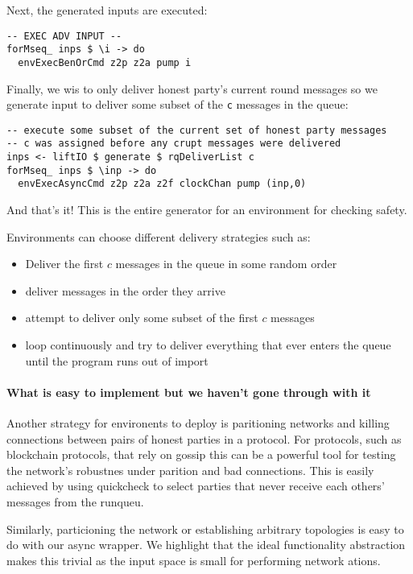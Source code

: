 Next, the generated inputs are executed:
\begin{lstlisting}
-- EXEC ADV INPUT --
forMseq_ inps $ \i -> do
  envExecBenOrCmd z2p z2a pump i
\end{lstlisting}
Finally, we wis to only deliver honest party's current round messages so we generate input to deliver some subset of the \texttt{c} messages in the queue:
\begin{lstlisting}
-- execute some subset of the current set of honest party messages 
-- c was assigned before any crupt messages were delivered
inps <- liftIO $ generate $ rqDeliverList c
forMseq_ inps $ \inp -> do
  envExecAsyncCmd z2p z2a z2f clockChan pump (inp,0)
\end{lstlisting}
And that's it! This is the entire generator for an environment for checking safety.

Environments can choose different delivery strategies such as:
\begin{itemize}
\item Deliver the first $c$ messages in the queue in some random order
\item deliver messages in the order they arrive
\item attempt to deliver only some subset of the first $c$ messages
\item loop continuously and try to deliver everything that ever enters the queue until the program runs out of import
\end{itemize}

\paragraph{What is easy to implement but we haven't gone through with it}
Another strategy for environents to deploy is paritioning networks and killing connections between pairs of honest parties in a protocol.
For protocols, such as blockchain protocols, that rely on gossip this can be a powerful tool for testing the network's robustnes under parition and bad connections.
This is easily achieved by using quickcheck to select parties that never receive each others' messages from the runqueu. 

Similarly, particioning the network or establishing arbitrary topologies is easy to do with our async wrapper.
We highlight that the ideal functionality abstraction makes this trivial as the input space is small for performing network ations.

